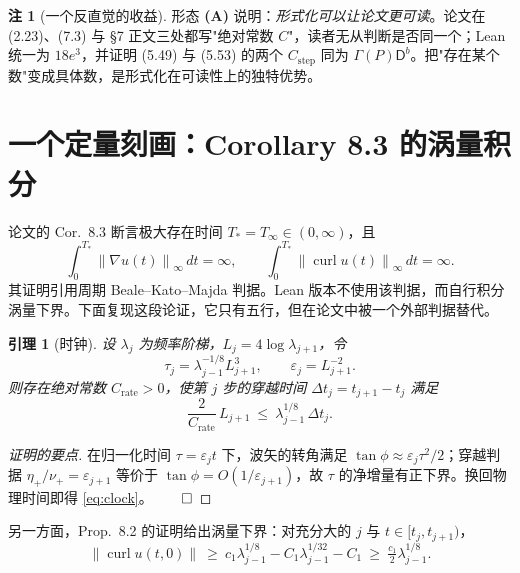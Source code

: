 \documentclass[11pt,a4paper]{ctexart}
\newtheorem{lemma}[theorem]{引理}
\theoremstyle{definition}
\newtheorem{remark}[theorem]{注}
\newcommand{\curl}{\operatorname{curl}}
\newcommand{\eps}{\varepsilon}
\newcommand{\norm}[1]{\left\lVert #1\right\rVert}
\begin{document}
\begin{remark}[一个反直觉的收益]
形态 \textbf{(A)} 说明：\emph{形式化可以让论文更可读}。论文在 (2.23)、(7.3) 与 \S7 正文三处都写"绝对常数 $C$"，读者无从判断是否同一个；Lean 统一为 $18e^3$，并证明 (5.49) 与 (5.53) 的两个 $C_{\text{step}}$ 同为 $\Gamma(P)\mathsf D^b$。把"存在某个数"变成具体数，是形式化在可读性上的独特优势。
\end{remark}

\section{一个定量刻画：Corollary 8.3 的涡量积分}\label{sec:curl}

论文的 Cor.~8.3 断言极大存在时间 $T_*=T_\infty\in(0,\infty)$，且
\begin{equation}\label{eq:integrals}
\int_0^{T_*}\norm{\nabla u(t)}_\infty\,dt=\infty,\qquad \int_0^{T_*}\norm{\curl u(t)}_\infty\,dt=\infty .
\end{equation}
其证明引用周期 Beale--Kato--Majda 判据。Lean 版本不使用该判据，而自行积分涡量下界。下面复现这段论证，它只有五行，但在论文中被一个外部判据替代。

\begin{lemma}[时钟]
设 $\lambda_j$ 为频率阶梯，$L_j=4\log\lambda_{j+1}$，令
\begin{equation}\label{eq:tau}
\tau_j=\lambda_{j-1}^{-1/8}L_{j+1}^{3},\qquad \eps_j=L_{j+1}^{-2}.
\end{equation}
则存在绝对常数 $C_{\mathrm{rate}}>0$，使第 $j$ 步的穿越时间 $\Delta t_j=t_{j+1}-t_j$ 满足
\begin{equation}\label{eq:clock}
\frac{2}{C_{\mathrm{rate}}}\,L_{j+1}\ \le\ \lambda_{j-1}^{1/8}\,\Delta t_j .
\end{equation}
\end{lemma}

\begin{proof}[证明的要点]
在归一化时间 $\tau=\eps_j t$ 下，波矢的转角满足 $\tan\phi\approx\eps_j\tau^{2}/2$；穿越判据 $\eta_+/\nu_+=\eps_{j+1}$ 等价于 $\tan\phi=O(1/\eps_{j+1})$，故 $\tau$ 的净增量有正下界。换回物理时间即得 \eqref{eq:clock}。$\qed$
\end{proof}

另一方面，Prop.~8.2 的证明给出涡量下界：对充分大的 $j$ 与 $t\in[t_j,t_{j+1})$，
\begin{equation}\label{eq:curllower}
\norm{\curl u(t,0)}\ \ge\ c_1\lambda_{j-1}^{1/8}-C_1\lambda_{j-1}^{1/32}-C_1\ \ge\ \tfrac{c_1}{2}\lambda_{j-1}^{1/8}.
\end{equation}
\end{document}
